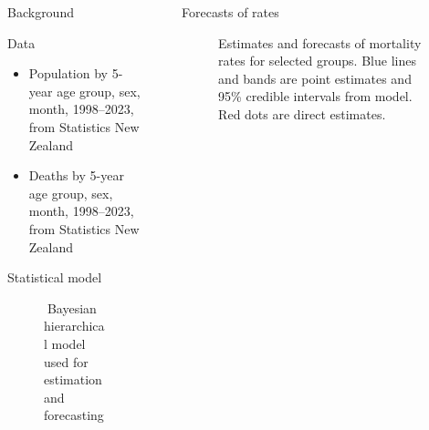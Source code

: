 \documentclass[final]{beamer}
\newlength{\sepwid}
\newlength{\onecolwid}
\newlength{\twocolwid}
\begin{document}
\begin{frame}[t]
\begin{columns}[t]
\begin{column}{\onecolwid}
\begin{block}{Background}
\end{block}


  \begin{block}{Data}

\begin{itemize}
\item Population by 5-year age group, sex, month, 1998--2023, from Statistics New Zealand
\item Deaths by 5-year age group, sex, month, 1998--2023, from Statistics New Zealand
\end{itemize}

\end{block}

\begin{block}{Statistical model}

\begin{figure}
\caption{$\;$Bayesian hierarchical model used for estimation and forecasting}
\end{figure}

\end{block}


\end{column} %

\begin{column}{\sepwid}\end{column} %

\begin{column}{\twocolwid} %

  \begin{columns}[t,totalwidth=\twocolwid] %

\begin{column}{\onecolwid}\vspace{-.6in} %

\begin{block}{Forecasts of rates}
\begin{figure}
\caption{Estimates and forecasts of mortality rates for selected groups. Blue lines and bands are point estimates and 95\% credible intervals from model. Red dots are direct estimates.}
\end{figure}
\end{block}


\end{column}
\end{columns}
\end{column}
\end{columns}
\end{frame}
\end{document}
